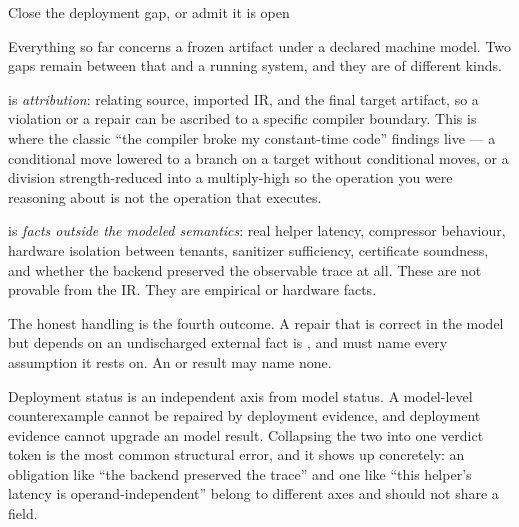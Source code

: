 \begin{step}{Close the deployment gap, or admit it is open}{%
}
\label{step:deployment}

Everything so far concerns a frozen artifact under a declared machine model. Two
gaps remain between that and a running system, and they are of different kinds.

 is \emph{attribution}: relating source, imported IR, and the final target
artifact, so a violation or a repair can be ascribed to a specific compiler
boundary. This is where the classic ``the compiler broke my constant-time code''
findings live --- a conditional move lowered to a branch on a target without
conditional moves, or a division strength-reduced into a multiply-high so the
operation you were reasoning about is not the operation that executes.

 is \emph{facts outside the modeled semantics}: real helper latency,
compressor behaviour, hardware isolation between tenants, sanitizer sufficiency,
certificate soundness, and whether the backend preserved the observable trace at
all. These are not provable from the IR. They are empirical or hardware facts.

The honest handling is the fourth outcome. A repair that is correct in the model
but depends on an undischarged external fact is \Conditional{}, and must name
every assumption it rests on. An \Unsafe{} or \Verified{} result may name none.

\begin{remark}
Deployment status is an independent axis from model status. A model-level
counterexample cannot be repaired by deployment evidence, and deployment evidence
cannot upgrade an \Unknown{} model result. Collapsing the two into one verdict
token is the most common structural error, and it shows up concretely: an
obligation like ``the backend preserved the trace'' and one like ``this helper's
latency is operand-independent'' belong to different axes and should not share a
field.
\end{remark}
\end{step}

